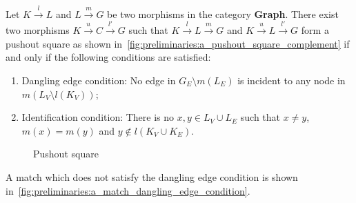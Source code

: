 \begin{proposition}
    Let $K \overset{l}{\rightarrow} L$ and $L \overset{m}{\rightarrow} G$ be two morphisms in the category \textbf{Graph}. There exist two morphisms $K \overset{u}{\rightarrow} C \overset{l'}{\rightarrow} G$ such that $K \overset{l}{\rightarrow} L \overset{m}{\rightarrow} G$ and $K \overset{u}{\rightarrow} L \overset{l'}{\rightarrow} G$ form a pushout square as shown in~\autoref{fig:preliminaries:a_pushout_square_complement} if and only if the following conditions are satisfied:
    \begin{enumerate} 
        \item{Dangling edge condition: } No edge in $G_E \setminus m(L_E)$ is incident to any node in $m(L_V \setminus l(K_V))$;
        \item{Identification condition: } There is no $x,y \in L_V \cup L_E$ such that $x \neq y$, $m(x) = m(y)$ and $y \notin l(K_V \cup K_E)$.
    \end{enumerate} 
    \begin{figure}[H]
        \centering
        \caption{Pushout square}
        \label{fig:preliminaries:a_pushout_square_complement}
    \end{figure}
\end{proposition}
A match which does not satisfy the dangling edge condition is shown in~\autoref{fig:preliminaries:a_match_dangling_edge_condition}.
